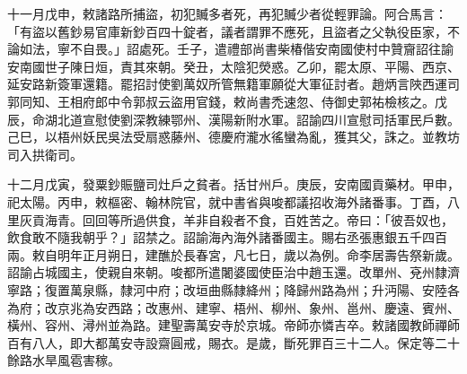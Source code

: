\begin{pinyinscope}
 十一月戊申，敕諸路所捕盜，初犯贓多者死，再犯贓少者從輕罪論。阿合馬言：「有盜以舊鈔易官庫新鈔百四十錠者，議者謂罪不應死，且盜者之父執役臣家，不論如法，寧不自畏。」詔處死。壬子，遣禮部尚書柴椿偕安南國使村中贊齎詔往諭安南國世子陳日烜，責其來朝。癸丑，太陰犯熒惑。乙卯，罷太原、平陽、西京、延安路新簽軍還籍。罷招討使劉萬奴所管無籍軍願從大軍征討者。趙炳言陜西運司郭同知、王相府郎中令郭叔云盜用官錢，敕尚書禿速忽、侍御史郭祐檢核之。戊辰，命湖北道宣慰使劉深教練鄂州、漢陽新附水軍。詔諭四川宣慰司括軍民戶數。己巳，以梧州妖民吳法受扇惑藤州、德慶府瀧水徭蠻為亂，獲其父，誅之。並教坊司入拱衛司。



 十二月戊寅，發粟鈔賑鹽司灶戶之貧者。括甘州戶。庚辰，安南國貢藥材。甲申，祀太陽。丙申，敕樞密、翰林院官，就中書省與唆都議招收海外諸番事。丁酉，八里灰貢海青。回回等所過供食，羊非自殺者不食，百姓苦之。帝曰：「彼吾奴也，飲食敢不隨我朝乎？」詔禁之。詔諭海內海外諸番國主。賜右丞張惠銀五千四百兩。敕自明年正月朔日，建醮於長春宮，凡七日，歲以為例。命李居壽告祭新歲。詔諭占城國主，使親自來朝。唆都所遣闍婆國使臣治中趙玉還。改單州、兗州隸濟寧路；復置萬泉縣，隸河中府；改垣曲縣隸絳州；降歸州路為州；升沔陽、安陸各為府；改京兆為安西路；改惠州、建寧、梧州、柳州、象州、邕州、慶遠、賓州、橫州、容州、潯州並為路。建聖壽萬安寺於京城。帝師亦憐吉卒。敕諸國教師禪師百有八人，即大都萬安寺設齋圓戒，賜衣。是歲，斷死罪百三十二人。保定等二十餘路水旱風雹害稼。



\end{pinyinscope}